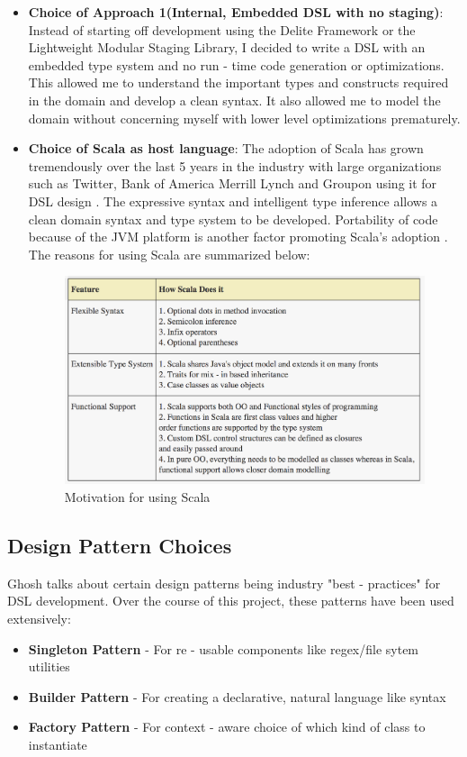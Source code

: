 \documentclass[12 pt]{article}
\begin{document}
\begin{itemize}
\item \textbf{Choice of Approach 1(Internal, Embedded DSL with no staging)}: Instead of starting off development using the Delite Framework or the Lightweight Modular Staging Library, I decided to write a DSL with an embedded type system and no run - time code generation or optimizations. This allowed me to understand the important types and constructs required in the domain and develop a clean syntax. It also allowed me to model the domain without concerning myself with lower level optimizations prematurely.

\item \textbf{Choice of Scala as host language}: The adoption of Scala has grown tremendously over the last 5 years in the industry with large organizations such as Twitter, Bank of America Merrill Lynch and Groupon using it for DSL design \cite{scala}. The expressive syntax and intelligent type inference allows a clean domain syntax and type system to be developed. Portability of code because of the JVM platform is another factor promoting Scala's adoption \cite{scala}. The reasons for using Scala are summarized below:

\begin{figure}[h!]
  \centering
    \includegraphics[width=400px]{figures/scala_motivation.png}
  \caption{Motivation for using Scala}
\end{figure}

\end{itemize}
\subsection{Design Pattern Choices}

Ghosh \cite{dslsInAction} talks about certain design patterns being industry "best - practices" for DSL development. Over the course of this project, these patterns have been used extensively:
\begin{itemize}
\item \textbf{Singleton Pattern} - For re - usable components like regex/file sytem utilities
\item \textbf{Builder Pattern} - For creating a declarative, natural language like syntax
\item \textbf{Factory Pattern} - For context - aware choice of which kind of class to instantiate
\end{itemize}
\end{document}
